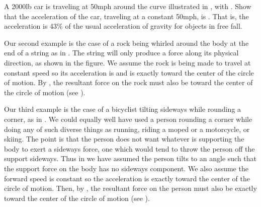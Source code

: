 {

\tryit A 2000\unit{lb} car is traveling at 50\unit{mph} around the curve
illustrated in , with .
Show that the acceleration of the car, traveling at a constant 50\unit{mph},
is .
That is, the acceleration is 43\% of the usual acceleration of gravity for
objects in free fall. 


Our second example is the case of a rock being whirled around the body at
the end of a string as in .
The string will only produce a force along its physical direction, as shown
in the figure.
We assume the rock is being made to travel at constant speed so its
acceleration is  and is exactly toward the center of the circle of
motion.
By , the resultant force on the rock must also be
toward the center of the circle of motion (see ).

Our third example is the case of a bicyclist tilting sideways while rounding
a corner, as in .
We could equally well have used a person rounding a corner while doing any
of such diverse things as running, riding a moped or a motorcycle, or
skiing.
The point is that the person does not want whatever is supporting the body
to exert a sideways force, one which would tend to throw the person off the
support sideways.
Thus in  we have assumed the person tilts to an angle such that
the support force on the body has no sideways component.
We also assume the forward speed is constant so the acceleration is exactly
toward the center of the circle of motion.
Then, by , the resultant force on the person must also
be exactly toward the center of the circle of motion (see ).


\enlargethispage{1pc}
}%
%

